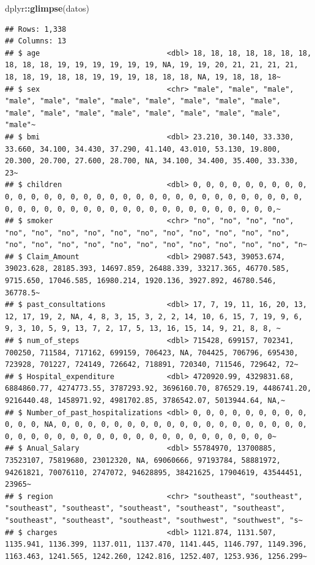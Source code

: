 \documentclass[
]{article}
\newenvironment{Shaded}{\begin{snugshade}}{\end{snugshade}}
\newcommand{\FunctionTok}[1]{\textcolor[rgb]{0.13,0.29,0.53}{\textbf{#1}}}
\newcommand{\NormalTok}[1]{#1}
\newcommand{\SpecialCharTok}[1]{\textcolor[rgb]{0.81,0.36,0.00}{\textbf{#1}}}
\begin{document}
\begin{Shaded}
\begin{Highlighting}[]
\NormalTok{dplyr}\SpecialCharTok{::}\FunctionTok{glimpse}\NormalTok{(datos)}
\end{Highlighting}
\end{Shaded}

\begin{verbatim}
## Rows: 1,338
## Columns: 13
## $ age                             <dbl> 18, 18, 18, 18, 18, 18, 18, 18, 18, 18, 19, 19, 19, 19, 19, 19, NA, 19, 19, 20, 21, 21, 21, 21, 18, 18, 19, 18, 18, 19, 19, 19, 18, 18, 18, NA, 19, 18, 18, 18~
## $ sex                             <chr> "male", "male", "male", "male", "male", "male", "male", "male", "male", "male", "male", "male", "male", "male", "male", "male", "male", "male", "male", "male"~
## $ bmi                             <dbl> 23.210, 30.140, 33.330, 33.660, 34.100, 34.430, 37.290, 41.140, 43.010, 53.130, 19.800, 20.300, 20.700, 27.600, 28.700, NA, 34.100, 34.400, 35.400, 33.330, 23~
## $ children                        <dbl> 0, 0, 0, 0, 0, 0, 0, 0, 0, 0, 0, 0, 0, 0, 0, 0, 0, 0, 0, 0, 0, 0, 0, 0, 0, 0, 0, 0, 0, 0, 0, 0, 0, 0, 0, 0, 0, 0, 0, 0, 0, 0, 0, 0, 0, 0, 0, 0, 0, 0, 0, 0, 0,~
## $ smoker                          <chr> "no", "no", "no", "no", "no", "no", "no", "no", "no", "no", "no", "no", "no", "no", "no", "no", "no", "no", "no", "no", "no", "no", "no", "no", "no", "no", "n~
## $ Claim_Amount                    <dbl> 29087.543, 39053.674, 39023.628, 28185.393, 14697.859, 26488.339, 33217.365, 46770.585, 9715.650, 17046.585, 16980.214, 1920.136, 3927.892, 46780.546, 36778.5~
## $ past_consultations              <dbl> 17, 7, 19, 11, 16, 20, 13, 12, 17, 19, 2, NA, 4, 8, 3, 15, 3, 2, 2, 14, 10, 6, 15, 7, 19, 9, 6, 9, 3, 10, 5, 9, 13, 7, 2, 17, 5, 13, 16, 15, 14, 9, 21, 8, 8, ~
## $ num_of_steps                    <dbl> 715428, 699157, 702341, 700250, 711584, 717162, 699159, 706423, NA, 704425, 706796, 695430, 723928, 701227, 724149, 726642, 718891, 720340, 711546, 729642, 72~
## $ Hospital_expenditure            <dbl> 4720920.99, 4329831.68, 6884860.77, 4274773.55, 3787293.92, 3696160.70, 876529.19, 4486741.20, 9216440.48, 1458971.92, 4981702.85, 3786542.07, 5013944.64, NA,~
## $ Number_of_past_hospitalizations <dbl> 0, 0, 0, 0, 0, 0, 0, 0, 0, 0, 0, 0, NA, 0, 0, 0, 0, 0, 0, 0, 0, 0, 0, 0, 0, 0, 0, 0, 0, 0, 0, 0, 0, 0, 0, 0, 0, 0, 0, 0, 0, 0, 0, 0, 0, 0, 0, 0, 0, 0, 0, 0, 0~
## $ Anual_Salary                    <dbl> 55784970, 13700885, 73523107, 75819680, 23012320, NA, 69060666, 97193784, 58881972, 94261821, 70076110, 2747072, 94628895, 38421625, 17904619, 43544451, 23965~
## $ region                          <chr> "southeast", "southeast", "southeast", "southeast", "southeast", "southeast", "southeast", "southeast", "southeast", "southeast", "southwest", "southwest", "s~
## $ charges                         <dbl> 1121.874, 1131.507, 1135.941, 1136.399, 1137.011, 1137.470, 1141.445, 1146.797, 1149.396, 1163.463, 1241.565, 1242.260, 1242.816, 1252.407, 1253.936, 1256.299~
\end{verbatim}
\end{document}
